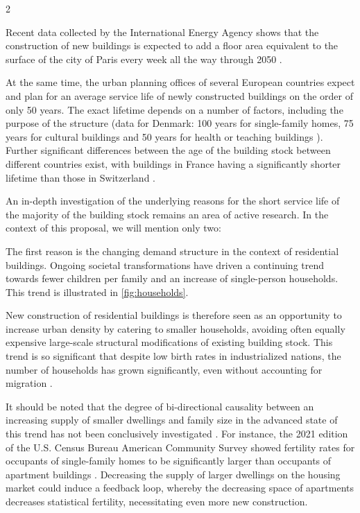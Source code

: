 \documentclass{article}
\begin{document}
\begin{multicols}{2}

Recent data collected by the International Energy Agency shows that the construction of new buildings is expected to add a floor area equivalent to the surface of the city of Paris every week all the way through 2050 \cite[Sec. 3.7]{cozzi_net_2021}.

At the same time, the urban planning offices of several European countries expect and plan for an average service life of newly constructed buildings on the order of only 50 years. The exact lifetime depends on a number of factors, including the purpose of the structure (data for Denmark: 100 years for single-family homes, 75 years for cultural buildings and 50 years for health or teaching buildings \cite{andersen_lifespan_2023}). Further significant differences between the age of the building stock between different countries exist, with buildings in France having a significantly shorter lifetime \cite{noauthor_value_2013} than those in Switzerland \cite{kornmann_service_2012}.

An in-depth investigation of the underlying reasons for the short service life of the majority of the building stock remains an area of active research. In the context of this proposal, we will mention only two:

The first reason is the changing demand structure in the context of residential buildings. Ongoing societal transformations have driven a continuing trend towards fewer children per family and an increase of single-person households. This trend is illustrated in \cref{fig:households}.

New construction of residential buildings is therefore seen as an opportunity to increase urban density by catering to smaller households, avoiding often equally expensive large-scale structural modifications of existing building stock. This trend is so significant that despite low birth rates in industrialized nations, the number of households has grown significantly, even without accounting for migration \cite{noauthor_why_2014}.

It should be noted that the degree of bi-directional causality between an increasing supply of smaller dwellings and family size in the advanced state of this trend has not been conclusively investigated \cite{kulu_fertility_2007}. For instance, the 2021 edition of the U.S. Census Bureau American Community Survey showed fertility rates for occupants of single-family homes to be significantly larger than occupants of apartment buildings \cite{noauthor_american_2021}. Decreasing the supply of larger dwellings on the housing market could induce a feedback loop, whereby the decreasing space of apartments decreases statistical fertility, necessitating even more new construction.

\end{multicols}
\end{document}
